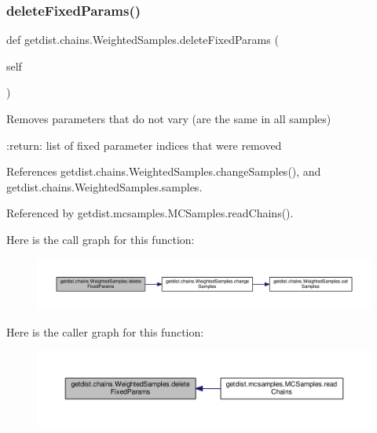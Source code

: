 \subsubsection{\texorpdfstring{delete\+Fixed\+Params()}{deleteFixedParams()}}
{\footnotesize\ttfamily def getdist.\+chains.\+Weighted\+Samples.\+delete\+Fixed\+Params (\begin{DoxyParamCaption}\item[{}]{self }\end{DoxyParamCaption})}

\begin{DoxyVerb}Removes parameters that do not vary (are the same in all samples)

:return: list of fixed parameter indices that were removed
\end{DoxyVerb}
 

References getdist.\+chains.\+Weighted\+Samples.\+change\+Samples(), and getdist.\+chains.\+Weighted\+Samples.\+samples.



Referenced by getdist.\+mcsamples.\+M\+C\+Samples.\+read\+Chains().

Here is the call graph for this function\+:
\nopagebreak
\begin{figure}[H]
\begin{center}
\leavevmode
\includegraphics[width=350pt]{classgetdist_1_1chains_1_1WeightedSamples_a5369d0f11ce50fafc68a3979134d3593_cgraph}
\end{center}
\end{figure}
Here is the caller graph for this function\+:
\nopagebreak
\begin{figure}[H]
\begin{center}
\leavevmode
\includegraphics[width=350pt]{classgetdist_1_1chains_1_1WeightedSamples_a5369d0f11ce50fafc68a3979134d3593_icgraph}
\end{center}
\end{figure}
\mbox{\label{classgetdist_1_1chains_1_1WeightedSamples_af496bff9dd6b71eaf5618760aa442f50}} 
